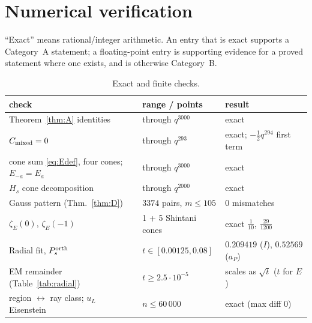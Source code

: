 
\section{Numerical verification}\label{sec:num}
``Exact'' means rational/integer arithmetic. An entry that is exact supports a Category~A statement; a floating-point entry
is supporting evidence for a proved statement where one exists, and is otherwise Category~B.

\begin{table}[ht]\centering\small
\begin{tabular}{p{6.2cm}p{4.2cm}p{4.2cm}}\toprule
check & range / points & result\\\midrule
Theorem~\ref{thm:A} identities & through $q^{3000}$ & exact\\
$C_{\mathrm{mixed}}=0$ & through $q^{293}$ & exact; $-\tfrac12q^{294}$ first term\\
cone sum \eqref{eq:Edef}, four cones; $E_{-a}=E_a$ & through $q^{3000}$ & exact\\
$H_s$ cone decomposition & through $q^{2000}$ & exact\\
Gauss pattern (Thm.~\ref{thm:D}) & $3374$ pairs, $m\le105$ & 0 mismatches\\
$\zeta_E(0)$, $\zeta_E(-1)$ & 1 + 5 Shintani cones & exact $\tfrac1{10}$, $\tfrac{29}{1200}$\\
Radial fit, $P^{\mathrm{orth}}_s$ & $t\in[0.00125,0.08]$ & $0.209419$ ($I$), $0.52569$ ($a_P$)\\
EM remainder (Table~\ref{tab:radial}) & $t\ge2.5\cdot10^{-5}$ & scales as $\sqrt t$ ($t$ for $E$)\\
region $\leftrightarrow$ ray class; $u_L$ Eisenstein & $n\le60\,000$ & exact (max diff $0$)\\
\bottomrule
\end{tabular}
\caption{Exact and finite checks.}
\end{table}

